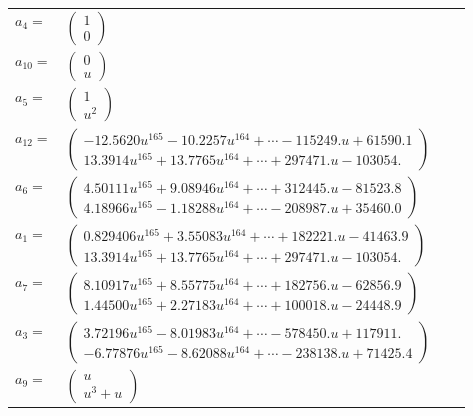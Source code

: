 \documentclass[1p]{elsarticle_modified}
\theoremstyle{definition}
\begin{document}
\begin{tabular}{m{7pt} m{180pt} m{7pt} m{180pt} }
\flushright $a_{4}=$&$\begin{pmatrix}1\\0\end{pmatrix}$ \\
\flushright $a_{10}=$&$\begin{pmatrix}0\\u\end{pmatrix}$ \\
\flushright $a_{5}=$&$\begin{pmatrix}1\\u^2\end{pmatrix}$ \\
\flushright $a_{12}=$&$\begin{pmatrix}-12.5620 u^{165}-10.2257 u^{164}+\cdots-115249. u+61590.1\\13.3914 u^{165}+13.7765 u^{164}+\cdots+297471. u-103054.\end{pmatrix}$ \\
\flushright $a_{6}=$&$\begin{pmatrix}4.50111 u^{165}+9.08946 u^{164}+\cdots+312445. u-81523.8\\4.18966 u^{165}-1.18288 u^{164}+\cdots-208987. u+35460.0\end{pmatrix}$ \\
\flushright $a_{1}=$&$\begin{pmatrix}0.829406 u^{165}+3.55083 u^{164}+\cdots+182221. u-41463.9\\13.3914 u^{165}+13.7765 u^{164}+\cdots+297471. u-103054.\end{pmatrix}$ \\
\flushright $a_{7}=$&$\begin{pmatrix}8.10917 u^{165}+8.55775 u^{164}+\cdots+182756. u-62856.9\\1.44500 u^{165}+2.27183 u^{164}+\cdots+100018. u-24448.9\end{pmatrix}$ \\
\flushright $a_{3}=$&$\begin{pmatrix}3.72196 u^{165}-8.01983 u^{164}+\cdots-578450. u+117911.\\-6.77876 u^{165}-8.62088 u^{164}+\cdots-238138. u+71425.4\end{pmatrix}$ \\
\flushright $a_{9}=$&$\begin{pmatrix}u\\u^3+u\end{pmatrix}$ \\

\end{tabular}
\end{document}
